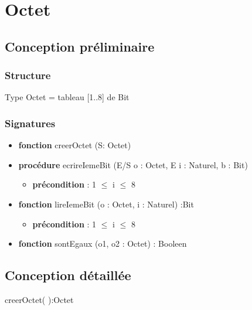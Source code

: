     \section*{Octet}
    \subsection*{Conception préliminaire}
    \subsubsection*{Structure}

    Type Octet = tableau [1..8] de Bit

    \subsubsection*{Signatures}
    \begin{itemize}[label=$\ $, leftmargin=1cm]
         \item \textbf{fonction} creerOctet (S: Octet)
         \item \textbf{procédure} ecrireIemeBit (E/S o : Octet, E i : Naturel, b : Bit)
            \begin{itemize}[label=$| $, leftmargin=1cm]
                \item \textbf{précondition} : 1 $\leq$ i $\leq$ 8
            \end{itemize}
        \item \textbf{fonction} lireIemeBit (o : Octet, i : Naturel) :Bit
            \begin{itemize}[label=$| $, leftmargin=1cm]
                \item \textbf{précondition} : 1 $\leq$ i $\leq$ 8
            \end{itemize}
        \item \textbf{fonction} sontEgaux (o1, o2 : Octet) : Booleen
    \end{itemize}

    \subsection*{Conception détaillée}

    \begin{function}
    \SetAlgoLined
    \caption{creerOctet( ):Octet}
    \end{function}

